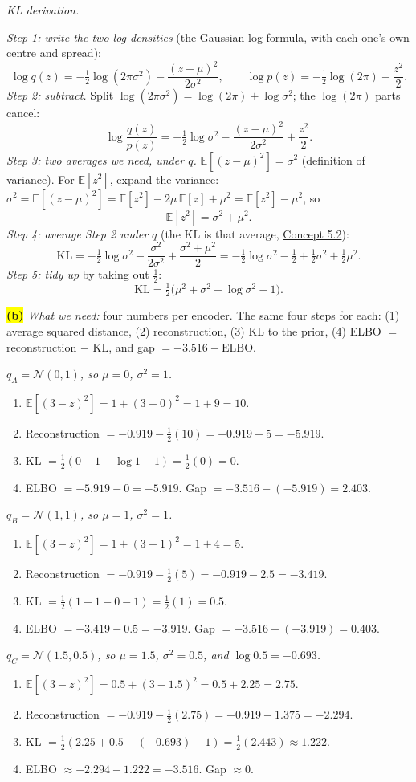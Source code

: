 \documentclass[12pt,a4paper]{article}
\begin{document}
\emph{KL derivation.}

\emph{Step 1: write the two log-densities} (the Gaussian log formula, with each one's own centre and spread):
\[
\log q(z)=-\tfrac12\log(2\pi\sigma^2)-\frac{(z-\mu)^2}{2\sigma^2},\qquad \log p(z)=-\tfrac12\log(2\pi)-\frac{z^2}{2}.
\]
\emph{Step 2: subtract.} Split $\log(2\pi\sigma^2)=\log(2\pi)+\log\sigma^2$; the $\log(2\pi)$ parts cancel:
\[
\log\frac{q(z)}{p(z)}=-\tfrac12\log\sigma^2-\frac{(z-\mu)^2}{2\sigma^2}+\frac{z^2}{2}.
\]
\emph{Step 3: two averages we need, under $q$.} $\mathbb{E}[(z-\mu)^2]=\sigma^2$ (definition of variance). For $\mathbb{E}[z^2]$, expand the variance: $\sigma^2=\mathbb{E}[(z-\mu)^2]=\mathbb{E}[z^2]-2\mu\,\mathbb{E}[z]+\mu^2=\mathbb{E}[z^2]-\mu^2$, so
\[
\mathbb{E}[z^2]=\sigma^2+\mu^2 .
\]
\emph{Step 4: average Step 2 under $q$} (the KL is that average, \hyperref[c5-2]{Concept 5.2}):
\[
\mathrm{KL}=-\tfrac12\log\sigma^2-\frac{\sigma^2}{2\sigma^2}+\frac{\sigma^2+\mu^2}{2}=-\tfrac12\log\sigma^2-\tfrac12+\tfrac12\sigma^2+\tfrac12\mu^2 .
\]
\emph{Step 5: tidy up} by taking out $\frac12$:
\[
\mathrm{KL}=\tfrac12\big(\mu^2+\sigma^2-\log\sigma^2-1\big).
\]

\colorbox{yellow}{\textbf{(b)}} \emph{What we need:} four numbers per encoder. The same four steps for each: (1) average squared distance, (2) reconstruction, (3) KL to the prior, (4) ELBO $=$ reconstruction $-$ KL, and gap $=-3.516-\text{ELBO}$.

\emph{$q_A=\mathcal{N}(0,1)$, so $\mu=0$, $\sigma^2=1$.}
\begin{enumerate}[nosep]
  \item $\mathbb{E}[(3-z)^2]=1+(3-0)^2=1+9=10$.
  \item Reconstruction $=-0.919-\frac12(10)=-0.919-5=-5.919$.
  \item KL $=\frac12(0+1-\log1-1)=\frac12(0)=0$.
  \item ELBO $=-5.919-0=-5.919$. Gap $=-3.516-(-5.919)=2.403$.
\end{enumerate}
\emph{$q_B=\mathcal{N}(1,1)$, so $\mu=1$, $\sigma^2=1$.}
\begin{enumerate}[nosep]
  \item $\mathbb{E}[(3-z)^2]=1+(3-1)^2=1+4=5$.
  \item Reconstruction $=-0.919-\frac12(5)=-0.919-2.5=-3.419$.
  \item KL $=\frac12(1+1-0-1)=\frac12(1)=0.5$.
  \item ELBO $=-3.419-0.5=-3.919$. Gap $=-3.516-(-3.919)=0.403$.
\end{enumerate}
\emph{$q_C=\mathcal{N}(1.5,0.5)$, so $\mu=1.5$, $\sigma^2=0.5$, and $\log0.5=-0.693$.}
\begin{enumerate}[nosep]
  \item $\mathbb{E}[(3-z)^2]=0.5+(3-1.5)^2=0.5+2.25=2.75$.
  \item Reconstruction $=-0.919-\frac12(2.75)=-0.919-1.375=-2.294$.
  \item KL $=\frac12(2.25+0.5-(-0.693)-1)=\frac12(2.443)\approx1.222$.
  \item ELBO $\approx-2.294-1.222=-3.516$. Gap $\approx0$.
\end{enumerate}
\end{document}
